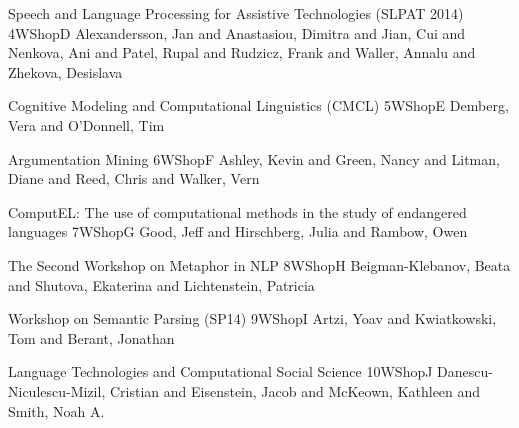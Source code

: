\begin{wsschedule}
  {Speech and Language Processing for Assistive Technologies (SLPAT 2014)}
  {4}{WShopD}
  {Alexandersson, Jan and Anastasiou, Dimitra and Jian, Cui and Nenkova, Ani and Patel, Rupal and
    Rudzicz, Frank and Waller, Annalu and Zhekova, Desislava}
  {\WShopLocD}
  
\end{wsschedule}
\begin{wsschedule}
  {Cognitive Modeling and Computational Linguistics (CMCL)}
  {5}{WShopE}
  {Demberg, Vera and O'Donnell, Tim}
  {\WShopLocE}
  
\end{wsschedule}
\begin{wsschedule}
  {Argumentation Mining}
  {6}{WShopF}
  {Ashley, Kevin and Green, Nancy and Litman, Diane and Reed, Chris and Walker, Vern}
  {\WShopLocF}
  
\end{wsschedule}
\begin{wsschedule}
  {ComputEL: The use of computational methods in the study of endangered languages}
  {7}{WShopG}
  {Good, Jeff and Hirschberg, Julia and Rambow, Owen}
  {\WShopLocG}
  
\end{wsschedule}
\begin{wsschedule}
  {The Second Workshop on Metaphor in NLP}
  {8}{WShopH}
  {Beigman-Klebanov, Beata and Shutova, Ekaterina and Lichtenstein, Patricia}
  {\WShopLocH}
  
\end{wsschedule}
\begin{wsschedule}
  {Workshop on Semantic Parsing (SP14)}
  {9}{WShopI}
  {Artzi, Yoav and Kwiatkowski, Tom and Berant, Jonathan}
  {\WShopLocI}
  
\end{wsschedule}
\begin{wsschedule}
  {Language Technologies and Computational Social Science}
  {10}{WShopJ}
  {Danescu-Niculescu-Mizil, Cristian and Eisenstein, Jacob and McKeown, Kathleen and Smith, Noah A.}
  {\WShopLocJ}
  
\end{wsschedule}



